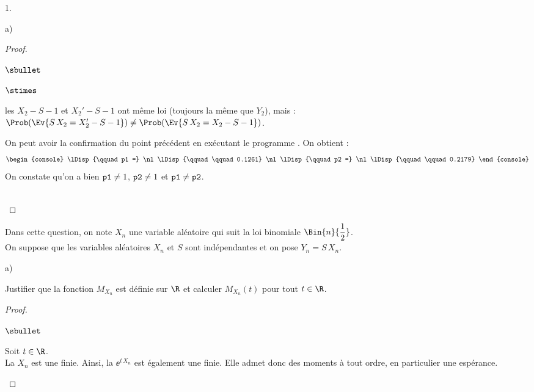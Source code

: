 \documentclass[11pt]{article}%
\begin{document}
\begin{noliste}{1.}
\begin{noliste}{a)}
\begin{proof}
\begin{remarkL}{.95}
\begin{noliste}{$\sbullet$}
\begin{noliste}{$\stimes$}
          \item les \var $X_2 -S-1$ et $X_2'-S-1$ ont même loi
            (toujours la même que $Y_2$), mais : $\Prob(\Ev{S \, X_2 =
              X_2' -S-1}) \neq \Prob(\Ev{S \, X_2 = X_2-S-1})$.
          \end{noliste}
          
        \item On peut avoir la confirmation du point précédent en
          exécutant le programme \Scilab{}. On obtient :
          \[
            \begin{console}
              \lDisp{\qquad p1 =} \nl %
              \lDisp{\qquad \qquad 0.1261} \nl %
              \lDisp{\qquad p2 =} \nl %
              \lDisp{\qquad \qquad 0.2179}
            \end{console}
          \]
          On constate qu'on a bien ${\tt p1} \neq 1$, ${\tt p2} \neq
          1$ et ${\tt p1} \neq {\tt p2}$. 
        \end{noliste}
      \end{remarkL}~\\[-1.4cm]
    \end{proof}
  \end{noliste}
  
\item Dans cette question, on note $X_n$ une variable aléatoire qui
  suit la loi binomiale $\Bin{n}{\dfrac{1}{2}}$.\\
  On suppose que les variables aléatoires $X_n$ et $S$ sont
  indépendantes et on pose $Y_n = S \, X_n$.
  \begin{noliste}{a)}
    \setlength{\itemsep}{2mm}
  \item Justifier que la fonction $M_{X_n}$ est définie sur $\R$ et
    calculer $M_{X_n}(t)$ pour tout $t\in \R$.
    \begin{proof}~
      \begin{noliste}{$\sbullet$}
      \item  Soit $t \in \R$.\\
        La \var $X_n$ est une \var finie. Ainsi, la \var $\ee^{t \,
          X_n}$ est également une \var finie. Elle admet donc des
        moments à tout ordre, en particulier une espérance.


        \newpage
        

\end{noliste}
\end{proof}
\end{noliste}
\end{noliste}
\end{document}

